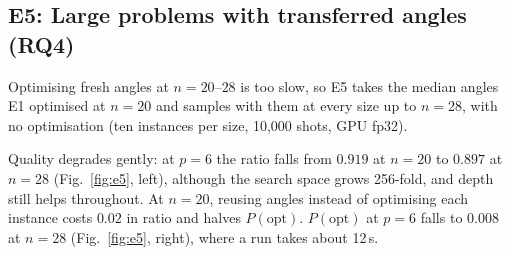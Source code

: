 
\subsection{E5: Large problems with transferred angles (RQ4)}
\label{sec:e5}

Optimising fresh angles at $n = 20$--$28$ is too slow, so E5 takes the median angles E1 optimised at $n = 20$ and samples with them at every size up to $n = 28$, with no optimisation (ten instances per size, 10{,}000 shots, GPU fp32).

Quality degrades gently: at $p = 6$ the ratio falls from $0.919$ at $n = 20$ to $0.897$ at $n = 28$ (Fig.~\ref{fig:e5}, left), although the search space grows 256-fold, and depth still helps throughout.
At $n = 20$, reusing angles instead of optimising each instance costs $0.02$ in ratio and halves $P(\text{opt})$.
$P(\text{opt})$ at $p = 6$ falls to $0.008$ at $n = 28$ (Fig.~\ref{fig:e5}, right), where a run takes about 12\,s.
